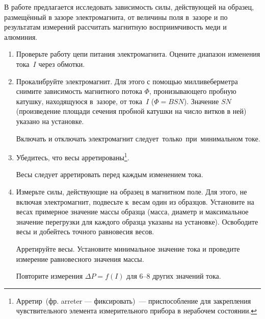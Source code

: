 \begin{lab:task}

В работе предлагается исследовать зависимость силы, действующей на образец, размещённый в зазоре электромагнита, от
величины поля в~зазоре и по результатам измерений рассчитать магнитную восприимчивость меди и алюминия.

\begin{enumerate}


\item Проверьте работу цепи питания электромагнита. Оцените диапазон изменения тока~$I$ через обмотки.

\item Прокалибруйте электромагнит. Для этого с помощью милливеберметра снимите зависимость магнитного потока $\Phi$,
пронизывающего пробную катушку, находящуюся в~зазоре, от тока~$I$ ($\Phi=BSN$). Значение $SN$ (произведение площади
сечения пробной катушки на число витков в ней) указано на установке.

\begin{lab:warning}
	Включать и отключать электромагнит следует~только~при~минимальном токе.
\end{lab:warning}

\item Убедитесь, что весы арретированы\footnote{Арретир~(фр. arreter --- фиксировать)~--- приспособление для закрепления
чувствительного элемента измерительного прибора в нерабочем состоянии.}.

\begin{lab:warning}
	Весы следует арретировать перед каждым изменением тока.
\end{lab:warning}

\item \label{item:4} Измерьте силы, действующие на образец в магнитном поле. Для этого, не включая электромагнит, подвесьте к~весам
один из образцов. Установите на весах примерное значение массы образца (масса, диаметр и максимальное значение
перегрузки для каждого образца указаны на установке). Освободите весы и добейтесь точного равновесия весов.

Арретируйте весы. Установите минимальное значение тока и проведите измерение равновесного значения массы.

Повторите измерения $\Delta P = f(I)$ для 6--8 других значений тока.


\end{enumerate}
\end{lab:task}
